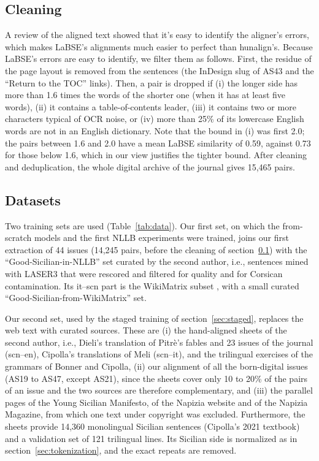\documentclass[11pt,a4paper]{article}
\begin{document}

\subsection{Cleaning}
\label{sec:cleaning}
A review of the aligned text 
showed that it's easy to identify the aligner's errors,
which makes LaBSE's alignments much easier to perfect than hunalign's.
Because LaBSE's errors are easy to identify, we filter them as follows.
First, the residue of the page layout is removed from the sentences
(the InDesign slug of AS43 and the ``Return to the TOC'' links).
Then, a pair is dropped if
(i) the longer side has more than 1.6 times the words of the shorter one (when it has at least five words),
(ii) it contains a table-of-contents leader,
(iii) it contains two or more characters typical of OCR noise, or
(iv) more than 25\% of its lowercase English words are not in an English dictionary.
Note that the bound in (i) was first 2.0; the pairs between 1.6 and 2.0 have a
mean LaBSE similarity of 0.59, against 0.73 for those below 1.6,
which in our view justifies the tighter bound. After cleaning and deduplication,
the whole digital archive of the journal gives 15{,}465 pairs.



\subsection{Datasets}
\label{sec:datasets}
Two training sets are used (Table~\ref{tab:data}).
Our first set, on which the from-scratch models and the first NLLB experiments were trained,
joins our first extraction of 44 issues
(14{,}245 pairs, before the cleaning of section~\ref{sec:cleaning}) with the
``Good-Sicilian-in-NLLB'' set curated by the second author, i.e., sentences mined with LASER3
\citep{heffernan2022laser3,nllb2022} that were rescored and filtered for quality and for Corsican
contamination. Its it--scn part is the WikiMatrix subset \citep{schwenk2021wikimatrix}, with a
small curated ``Good-Sicilian-from-WikiMatrix'' set.

Our second set, used by the staged training of section~\ref{sec:staged}, replaces the web text
with curated sources. These are (i) the hand-aligned sheets of the second author, i.e., Dieli's
translation of Pitr\`e's fables and 23 issues of the journal (scn--en), Cipolla's translations
of Meli (scn--it), and the trilingual exercises of the grammars of Bonner and Cipolla, (ii) our
alignment of all the born-digital issues (AS19 to AS47, except AS21), since the sheets cover only 10 to 20\% of the pairs of
an issue and the two sources are therefore complementary, and (iii) the parallel pages of the
Young Sicilian Manifesto, of the Napizia website and of the Napizia Magazine,
from which one text under copyright was excluded.
Furthermore, the sheets provide 14{,}360 monolingual Sicilian sentences
(Cipolla's 2021 textbook) and a validation set of 121 trilingual lines. Its Sicilian side is
normalized as in section~\ref{sec:tokenization}, and the exact repeats are removed.
\end{document}
